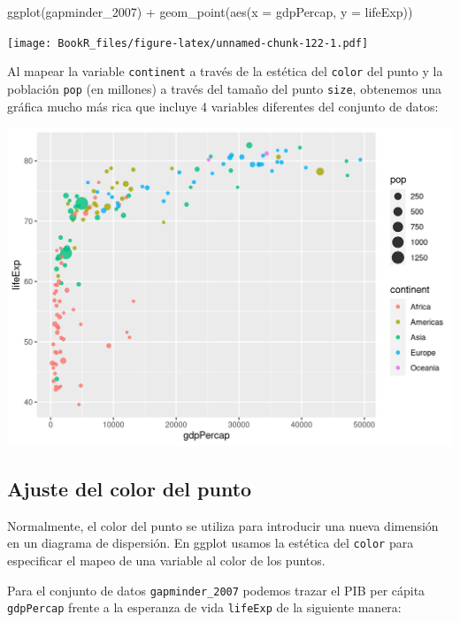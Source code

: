 \documentclass[
]{book}
\newenvironment{Shaded}{\begin{snugshade}}{\end{snugshade}}
\newcommand{\AttributeTok}[1]{\textcolor[rgb]{0.77,0.63,0.00}{#1}}
\newcommand{\FunctionTok}[1]{\textcolor[rgb]{0.00,0.00,0.00}{#1}}
\newcommand{\NormalTok}[1]{#1}
\newcommand{\SpecialCharTok}[1]{\textcolor[rgb]{0.00,0.00,0.00}{#1}}
\begin{document}
\begin{Shaded}
\begin{Highlighting}[]
\FunctionTok{ggplot}\NormalTok{(gapminder\_2007) }\SpecialCharTok{+} 
  \FunctionTok{geom\_point}\NormalTok{(}\FunctionTok{aes}\NormalTok{(}\AttributeTok{x =}\NormalTok{ gdpPercap, }\AttributeTok{y =}\NormalTok{ lifeExp))}
\end{Highlighting}
\end{Shaded}

\texttt{[image: BookR\_files/figure-latex/unnamed-chunk-122-1.pdf]}

Al mapear la variable \texttt{continent} a través de la estética del \texttt{color} del punto y la población \texttt{pop} (en millones) a través del tamaño del punto \texttt{size}, obtenemos una gráfica mucho más rica que incluye 4 variables diferentes del conjunto de datos:

\includegraphics{img/un4.png}

\hypertarget{ajuste-del-color-del-punto}{%
\subsection{Ajuste del color del punto}\label{ajuste-del-color-del-punto}}

Normalmente, el color del punto se utiliza para introducir una nueva dimensión en un diagrama de dispersión. En ggplot usamos la estética del \texttt{color} para especificar el mapeo de una variable al color de los puntos.

Para el conjunto de datos \texttt{gapminder\_2007} podemos trazar el PIB per cápita \texttt{gdpPercap} frente a la esperanza de vida \texttt{lifeExp} de la siguiente manera:
\end{document}
